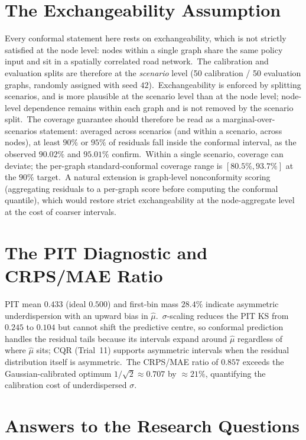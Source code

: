 \section{The Exchangeability Assumption}\label{sec:exchangeability}

Every conformal statement here rests on exchangeability, which is not strictly satisfied at the node level: nodes within a single graph share the same policy input and sit in a spatially correlated road network.\ The calibration and evaluation splits are therefore at the \emph{scenario} level (50 calibration / 50 evaluation graphs, randomly assigned with seed $42$).\ Exchangeability is enforced by splitting scenarios, and is more plausible at the scenario level than at the node level; node-level dependence remains within each graph and is not removed by the scenario split.\ The coverage guarantee should therefore be read as a marginal-over-scenarios statement: averaged across scenarios (and within a scenario, across nodes), at least $90\%$ or $95\%$ of residuals fall inside the conformal interval, as the observed $90.02\%$ and $95.01\%$ confirm.\ Within a single scenario, coverage can deviate; the per-graph standard-conformal coverage range is $[80.5\%, 93.7\%]$ at the $90\%$ target.\ A natural extension is graph-level nonconformity scoring (aggregating residuals to a per-graph score before computing the conformal quantile), which would restore strict exchangeability at the node-aggregate level at the cost of coarser intervals.

\section{The PIT Diagnostic and CRPS/MAE Ratio}\label{sec:pit_discussion}

PIT mean $0.433$ (ideal $0.500$) and first-bin mass $28.4\%$ indicate asymmetric underdispersion with an upward bias in $\hat\mu$.\ $\sigma$-scaling reduces the PIT KS from $0.245$ to $0.104$ but cannot shift the predictive centre, so conformal prediction handles the residual tails because its intervals expand around $\hat\mu$ regardless of where $\hat\mu$ sits; CQR (Trial~11) supports asymmetric intervals when the residual distribution itself is asymmetric.\ The CRPS/MAE ratio of $0.857$ exceeds the Gaussian-calibrated optimum $1/\sqrt{2} \approx 0.707$ by $\approx 21\%$, quantifying the calibration cost of underdispersed $\sigma$.

\section{Answers to the Research Questions}\label{sec:rq_answers}

